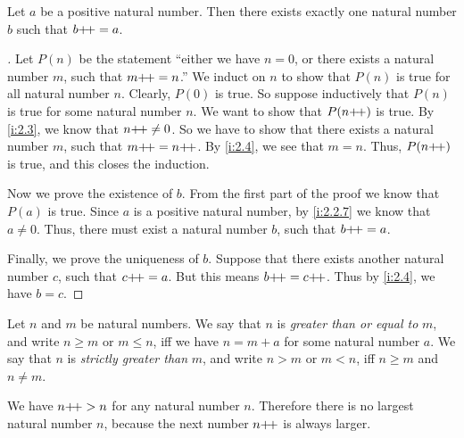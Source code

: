 \begin{lem}\label{i:2.2.10}
  Let \(a\) be a positive natural number.
  Then there exists exactly one natural number \(b\) such that \(b{+}\!{+} = a\).
\end{lem}

\begin{proof}[]
  Let \(P(n)\) be the statement ``either we have \(n = 0\), or there exists a natural number \(m\), such that \(m{+}\!{+} = n\).''
  We induct on \(n\) to show that \(P(n)\) is true for all natural number \(n\).
  Clearly, \(P(0)\) is true.
  So suppose inductively that \(P(n)\) is true for some natural number \(n\).
  We want to show that \(P(n{+}\!{+})\) is true.
  By \cref{i:2.3}, we know that \(n{+}\!{+} \neq 0\).
  So we have to show that there exists a natural number \(m\), such that \(m{+}\!{+} = n{+}\!{+}\).
  By \cref{i:2.4}, we see that \(m = n\).
  Thus, \(P(n{+}\!{+})\) is true, and this closes the induction.

  Now we prove the existence of \(b\).
  From the first part of the proof we know that \(P(a)\) is true.
  Since \(a\) is a positive natural number, by \cref{i:2.2.7} we know that \(a \neq 0\).
  Thus, there must exist a natural number \(b\), such that \(b{+}\!{+} = a\).

  Finally, we prove the uniqueness of \(b\).
  Suppose that there exists another natural number \(c\), such that \(c{+}\!{+} = a\).
  But this means \(b{+}\!{+} = c{+}\!{+}\).
  Thus by \cref{i:2.4}, we have \(b = c\).
\end{proof}

\begin{defn}\label{i:2.2.11}
  Let \(n\) and \(m\) be natural numbers.
  We say that \(n\) is \emph{greater than or equal to} \(m\), and write \(n \geq m\) or \(m \leq n\), iff we have \(n = m + a\) for some natural number \(a\).
  We say that \(n\) is \emph{strictly greater than} \(m\), and write \(n > m\) or \(m < n\), iff \(n \geq m\) and \(n \neq m\).
\end{defn}

\begin{ac}\label{i:ac:2.2.3}
  We have \(n{+}\!{+} > n\) for any natural number \(n\).
  Therefore there is no largest natural number \(n\), because the next number \(n{+}\!{+}\) is always larger.
\end{ac}

